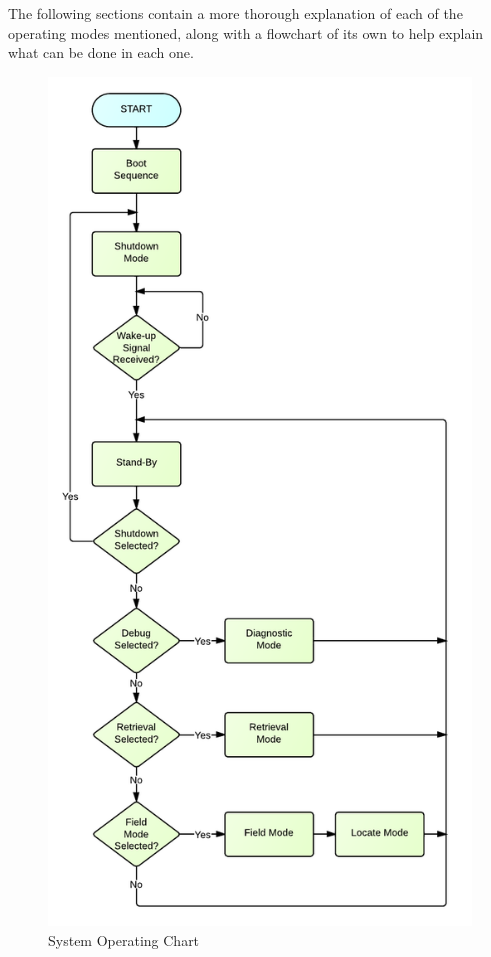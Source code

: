 The following sections contain a more thorough explanation of each of the operating modes mentioned, along with a flowchart of its own to help explain what can be done in each one.
\begin{figure}[H]
	\centering
	\includegraphics[scale=0.8]{img/SystemFlowchart}
	\caption{System Operating Chart \label{fig:systemFlowchart}}
\end{figure}

